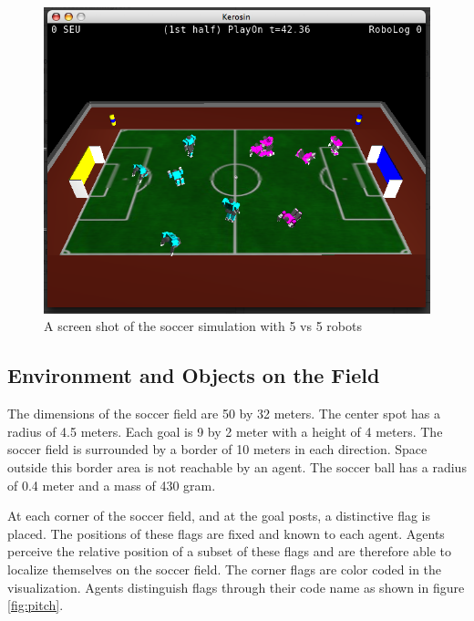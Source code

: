 \begin{figure}[htp]
  \centering
  \includegraphics[width=\textwidth]{fig/soccersim}
  \caption{A screen shot of the soccer simulation with 5 vs 5 robots}
  \label{fig:soccersim}
\end{figure}

\subsection{Environment and Objects on the Field}

The dimensions of the soccer field are 50 by 32 meters. The center
spot has a radius of 4.5 meters. Each goal is 9 by 2 meter with a
height of 4 meters. The soccer field is surrounded by a border of 10
meters in each direction. Space outside this border area is not
reachable by an agent. The soccer ball has a radius of 0.4 meter and a
mass of 430 gram.

At each corner of the soccer field, and at the goal posts, a distinctive
flag is placed. The positions of these flags are fixed and known to
each agent. Agents perceive the relative position of a subset of
these flags and are therefore able to localize themselves on the soccer
field. The corner flags are color coded in the visualization. Agents
distinguish flags through their code name as shown in figure
\ref{fig:pitch}.

